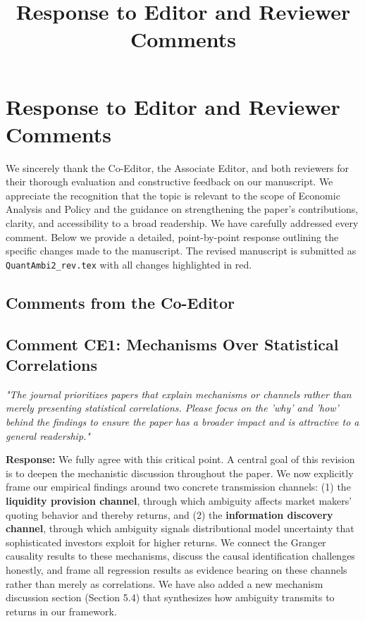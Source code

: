 \documentclass[12pt]{article}
\title{Response to Editor and Reviewer Comments}
\author{}
\date{}
\begin{document}
\maketitle

\section*{Response to Editor and Reviewer Comments}

We sincerely thank the Co-Editor, the Associate Editor, and both reviewers for their thorough evaluation and constructive feedback on our manuscript. We appreciate the recognition that the topic is relevant to the scope of Economic Analysis and Policy and the guidance on strengthening the paper's contributions, clarity, and accessibility to a broad readership. We have carefully addressed every comment. Below we provide a detailed, point-by-point response outlining the specific changes made to the manuscript. The revised manuscript is submitted as \texttt{QuantAmbi2\_rev.tex} with all changes highlighted in red.

\subsection*{Comments from the Co-Editor}

\subsection*{Comment CE1: Mechanisms Over Statistical Correlations}
\textit{"The journal prioritizes papers that explain mechanisms or channels rather than merely presenting statistical correlations. Please focus on the 'why' and 'how' behind the findings to ensure the paper has a broader impact and is attractive to a general readership."}

\begin{highlightbox}
\textbf{Response:} We fully agree with this critical point. A central goal of this revision is to deepen the mechanistic discussion throughout the paper. We now explicitly frame our empirical findings around two concrete transmission channels: (1) the \textbf{liquidity provision channel}, through which ambiguity affects market makers' quoting behavior and thereby returns, and (2) the \textbf{information discovery channel}, through which ambiguity signals distributional model uncertainty that sophisticated investors exploit for higher returns. We connect the Granger causality results to these mechanisms, discuss the causal identification challenges honestly, and frame all regression results as evidence bearing on these channels rather than merely as correlations. We have also added a new mechanism discussion section (Section 5.4) that synthesizes how ambiguity transmits to returns in our framework.
\end{highlightbox}
\end{document}

